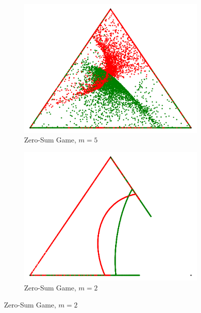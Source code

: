 \documentclass[a4paper,DIV=11,abstracton,twoside=semi]{scrreprt}
\theoremstyle{definition}
\begin{document}
    \begin{figure}[h]
        \centering
        \begin{subfigure}[t]{0.49\textwidth}
            \includegraphics[width=\textwidth]{Pictures/paretoNash-curvyRegionsManyOutliers-k5}
            \caption{Zero-Sum Game, $m=5$}
        \end{subfigure}
        \begin{subfigure}[t]{0.49\textwidth}
            \includegraphics[width=\textwidth]{Pictures/paretoNash-curves1-k2}
            \caption{Zero-Sum Game, $m=2$}
        \end{subfigure}
        
        \vspace*{0.01\textwidth}
        

\end{figure}
\end{document}
